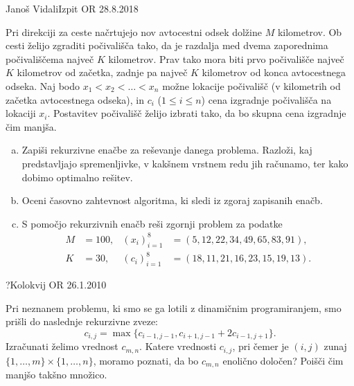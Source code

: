 \begin{naloga}{Janoš Vidali}{Izpit OR 28.8.2018}
\begin{vprasanje}
Pri direkciji za ceste načrtujejo nov avtocestni odsek dolžine $M$ kilometrov.
Ob cesti želijo zgraditi počivališča tako,
da je razdalja med dvema zaporednima počivališčema največ $K$ kilometrov.
Prav tako mora biti prvo počivališče največ $K$ kilometrov od začetka,
zadnje pa največ $K$ kilometrov od konca avtocestnega odseka.
Naj bodo $x_1 < x_2 < \dots < x_n$ možne lokacije počivališč
(v kilometrih od začetka avtocestnega odseka),
in $c_i$ ($1 \le i \le n$) cena izgradnje počivališča na lokaciji $x_i$.
Postavitev počivališč želijo izbrati tako,
da bo skupna cena izgradnje čim manjša.

\begin{enumerate}[(a)]
\item Zapiši rekurzivne enačbe za reševanje danega problema.
Razloži, kaj pred\-stav\-lja\-jo spremenljivke,
v kakšnem vrstnem redu jih računamo, ter kako dobimo optimalno rešitev.

\item Oceni časovno zahtevnost algoritma, ki sledi iz zgoraj zapisanih enačb.

\item S pomočjo rekurzivnih enačb reši zgornji problem za podatke
\begin{align*}
M &= 100, & (x_i)_{i=1}^8 &= ( 5, 12, 22, 34, 49, 65, 83, 91), \\
K &= 30,  & (c_i)_{i=1}^8 &= (18, 11, 21, 16, 23, 15, 19, 13).
\end{align*}
\end{enumerate}
\end{vprasanje}
\begin{odgovor}
\end{odgovor}
\end{naloga}


\begin{naloga}{?}{Kolokvij OR 26.1.2010}
\begin{vprasanje}
Pri neznanem problemu, ki smo se ga lotili z dinamičnim programiranjem,
smo prišli do naslednje rekurzivne zveze:
$$
c_{i,j} = \max\{c_{i-1,j-1}, c_{i+1,j-1} + 2c_{i-1,j+1}\} .
$$
Izračunati želimo vrednost $c_{m,n}$.
Katere vrednosti $c_{i,j}$,
pri čemer je $(i, j)$ zunaj $\{1, \dots, m\} \times \{1, \dots, n\}$,
moramo poznati, da bo $c_{m,n}$ enolično določen?
Poišči čim manjšo takšno množico.
\end{vprasanje}
\begin{odgovor}
\end{odgovor}
\end{naloga}


